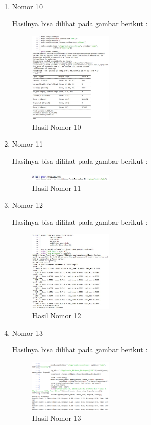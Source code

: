 \begin{enumerate}
\item Nomor 10
\hfill\break
	
Hasilnya bisa dilihat pada gambar berikut :
\hfill\break
	\begin{figure}[H]
		\includegraphics[width=4cm]{figures/1174054/7/20.JPG}
		\centering
		\caption{Hasil Nomor 10}
	\end{figure}
	
\item Nomor 11
\hfill\break
	
Hasilnya bisa dilihat pada gambar berikut :
\hfill\break
	\begin{figure}[H]
		\includegraphics[width=4cm]{figures/1174054/7/21.JPG}
		\centering
		\caption{Hasil Nomor 11}
	\end{figure}
	
\item Nomor 12
\hfill\break
	
Hasilnya bisa dilihat pada gambar berikut :
\hfill\break
	\begin{figure}[H]
		\includegraphics[width=4cm]{figures/1174054/7/22.JPG}
		\centering
		\caption{Hasil Nomor 12}
	\end{figure}
	
\item Nomor 13
\hfill\break
	
Hasilnya bisa dilihat pada gambar berikut :
\hfill\break
	\begin{figure}[H]
		\includegraphics[width=4cm]{figures/1174054/7/23.PNG}
		\centering
		\caption{Hasil Nomor 13}
	\end{figure}
	

\end{enumerate}
